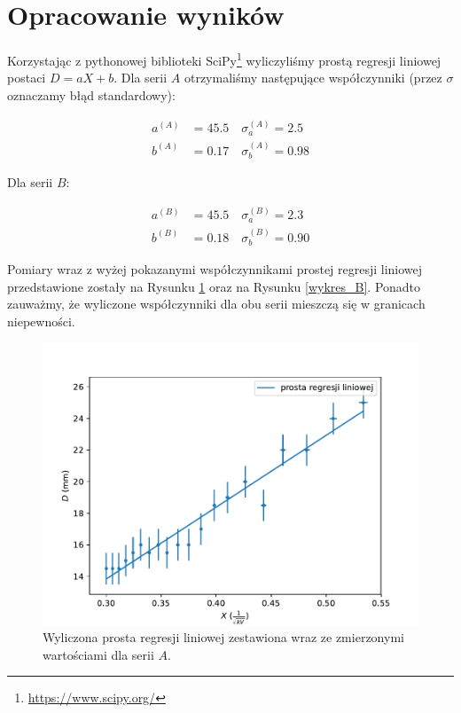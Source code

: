 \documentclass[a4paper]{article}
\begin{document}
\section{Opracowanie wyników}

Korzystając z pythonowej biblioteki SciPy\footnote{\url{https://www.scipy.org/}} wyliczyliśmy prostą regresji liniowej postaci $D = aX + b$.
Dla serii $A$ otrzymaliśmy następujące współczynniki (przez $\sigma$ oznaczamy błąd standardowy):

\begin{align*}
	a^{(A)} &= 45.5 \quad \sigma_a^{(A)} = 2.5 \\
	b^{(A)} &= 0.17 \quad \sigma_b^{(A)} = 0.98
\end{align*}

Dla serii $B$:

\begin{align*}
	a^{(B)} &= 45.5 \quad \sigma_a^{(B)} = 2.3 \\
	b^{(B)} &= 0.18 \quad \sigma_b^{(B)} = 0.90
\end{align*}

Pomiary wraz z wyżej pokazanymi współczynnikami prostej regresji liniowej przedstawione zostały na Rysunku \ref{wykres_A} oraz na Rysunku \ref{wykres_B}.
Ponadto zauważmy, że wyliczone współczynniki dla obu serii mieszczą się w granicach niepewności.

\begin{figure}[h]
\centering
\includegraphics[scale=0.7]{wykres_A.pdf}
\caption{Wyliczona prosta regresji liniowej zestawiona wraz ze zmierzonymi wartościami dla serii $A$.}
\label{wykres_A}
\end{figure}
\end{document}
